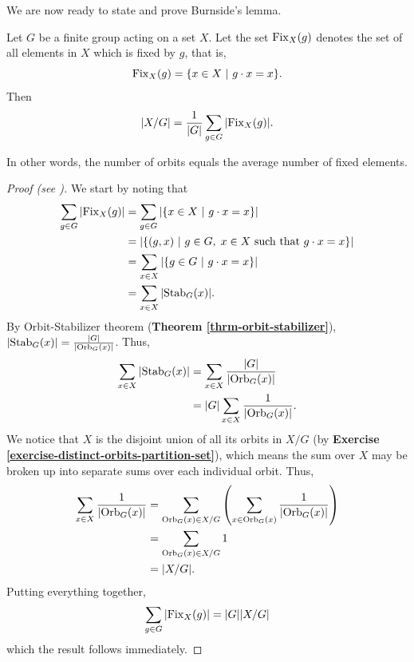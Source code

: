 We are now ready to state and prove Burnside's lemma.
\begin{lemma}[Burnside]\label{lemma-burnside}
    Let $G$ be a finite group acting on a set $X$. Let the set $\mathrm{Fix}_{X}(g)$ denotes the set of all elements in $X$ which is fixed by $g$, that is,
    \[
        \Fix{X}{g} = \{x \in X \ | \ g\cdot x = x\}.
    \]
    Then
    \[
        |X/G| = \frac{1}{|G|}\sum_{g\in G} |\mathrm{Fix}_{X}(g)|.
    \]
\end{lemma}
In other words, the number of orbits equals the average number of fixed elements.
\begin{proof}[Proof (see \cite{proofwiki_burnsideslemma})]
    We start by noting that
    \begin{align*}
        \sum_{g\in G} |\Fix{X}{g}| &= \sum_{g\in G} |\{x \in X \ | \ g\cdot x = x\}|\\
        &= |\{(g, x) \ | \ g \in G,\; x \in X \text{ such that } g\cdot x = x\}|\\
        &= \sum_{x\in X} |\{g \in G \ | \ g\cdot x = x\}|\\
        &= \sum_{x\in X} |\Stab{G}{x}|.
    \end{align*}
    By Orbit-Stabilizer theorem (\textbf{Theorem \ref{thrm-orbit-stabilizer}}), $|\mathrm{Stab}_{G}(x)| = \frac{|G|}{|\mathrm{Orb}_{G}(x)|}$. Thus,
    \begin{align*}
        \sum_{x\in X} |\mathrm{Stab}_{G}(x)| &= \sum_{x\in X} \frac{|G|}{|\mathrm{Orb}_{G}(x)|}\\
        &= |G|\sum_{x\in X} \frac{1}{|\mathrm{Orb}_{G}(x)|}.
    \end{align*}
    We notice that $X$ is the disjoint union of all its orbits in $X/G$ (by \textbf{Exercise \ref{exercise-distinct-orbits-partition-set}}), which means the sum over $X$ may be broken up into separate sums over each individual orbit. Thus,
    \begin{align*}
        \sum_{x\in X} \frac{1}{|\mathrm{Orb}_{G}(x)|} &= \sum_{\mathrm{Orb}_{G}(x) \in X/G}\left(\sum_{x \in \mathrm{Orb}_{G}(x)} \frac{1}{|\mathrm{Orb}_{G}(x)|}\right)\\
        &= \sum_{\mathrm{Orb}_{G}(x) \in X/G} 1\\
        &= |X/G|.
    \end{align*}
    Putting everything together,
    \[
        \sum_{g\in G} |\mathrm{Fix}_{X}(g)| = |G||X/G|
    \]
    which the result follows immediately.
\end{proof}

\newpage


